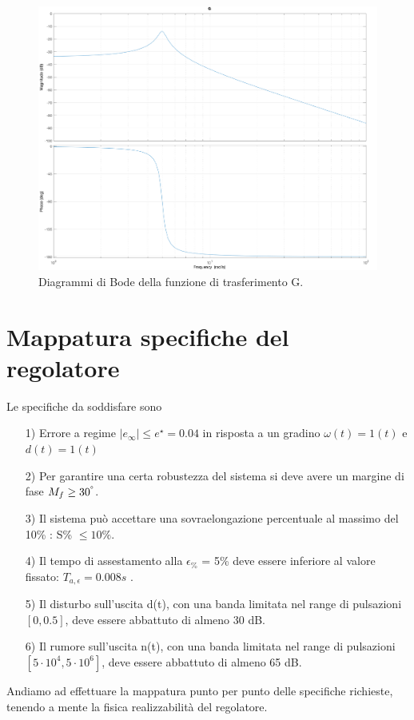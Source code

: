\documentclass[a4paper, 11pt]{article}
\begin{document}
\begin{figure}[h!]
	\centering
	\includegraphics[width=0.75\linewidth]{./images/bode_G.png}
	\caption{Diagrammi di Bode della funzione di trasferimento G.}
	\label{fig:G_bode}
\end{figure}

\section{Mappatura specifiche del regolatore}
\label{sec:specifications}

Le specifiche da soddisfare sono
\begin{itemize}
	\item[1)] Errore a regime $|e_{\infty}| \leq e^{\star} = 0.04$ in risposta a un gradino $\omega (t) = 1(t)$ e $d(t)=1(t)$
	\item[2)] Per garantire una certa robustezza del sistema si deve avere un margine di fase $M_f \geq 30^{\degree}$.
	\item[3)] Il sistema può accettare una sovraelongazione percentuale al massimo del 10\% : S\% $\leq 10\%$.
	\item[4)] Il tempo di assestamento alla $\epsilon_{\%}$ = 5\% deve essere inferiore al valore fissato: $T_{a, \epsilon} = 0.008s$ .
	\item[5)] Il disturbo sull'uscita d(t), con una banda limitata nel range di pulsazioni $[0, 0.5]$, deve essere abbattuto di almeno 30 dB.
	\item[6)] Il rumore sull'uscita n(t), con una banda limitata nel range di pulsazioni $[5 \cdot 10^4, 5 \cdot 10^6]$, deve essere abbattuto di almeno 65 dB.
\end{itemize}
%
Andiamo ad effettuare la mappatura punto per punto delle specifiche richieste, tenendo a mente la fisica realizzabilità del regolatore.  
\end{document}

